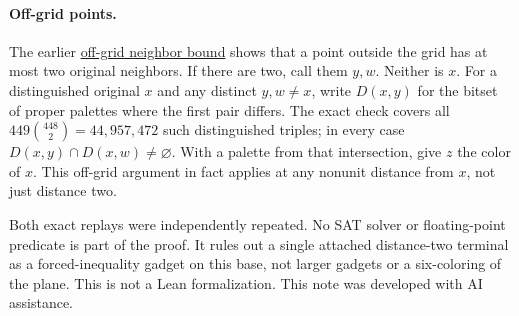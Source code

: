 \documentclass[10pt,letterpaper]{article}
\begin{document}
\paragraph{Off-grid points.}
The earlier
\href{https://github.com/Aafimalek/novel-discoveries/tree/6376de4361b98f605326dd6275fa5f9e8b5dd3fb/hadwiger-nelson/verification/g449/prime-seven-catalogue/six-off-grid-extensions}{off-grid neighbor bound}
shows that a point outside the grid has at most two original
neighbors. If there are two, call them \(y,w\). Neither is
\(x\). For a distinguished original \(x\) and any distinct
\(y,w\ne x\), write \(D(x,y)\) for the bitset of proper palettes
where the first pair differs. The exact check covers all
\(449\binom{448}{2}=44{,}957{,}472\) such distinguished triples;
in every case \(D(x,y)\cap D(x,w)\ne\varnothing\).
With a palette from that intersection, give \(z\) the color
of \(x\). This off-grid argument in fact applies at any
nonunit distance from \(x\), not just distance two.

\medskip\noindent
Both exact replays were independently repeated. No SAT solver
or floating-point predicate is part of the proof. It rules out a
single attached distance-two terminal as a forced-inequality
gadget on this base, not larger gadgets or a six-coloring of
the plane. This is not a Lean formalization.
This note was developed with AI assistance.
\end{document}
